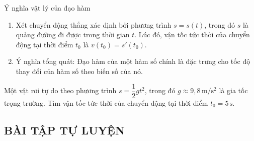 \begin{dang}{Ý nghĩa vật lý của đạo hàm}
	\begin{enumerate}[\iconCH]
		\item Xét chuyển động thẳng xác định bởi phương trình $s=s(t)$, trong đó $s$ là quảng đường đi được trong thời gian $t$. Lúc đó, vận tốc tức thời của chuyển động tại thời điểm $t_0$ là $v(t_0)=s'(t_0)$.
		\item Ý nghĩa tổng quát: Đạo hàm của một hàm số chính là đặc trưng cho tốc độ thay đổi của hàm số theo biến số của nó.
	\end{enumerate}
\end{dang}
\begin{vd}
	Một vật rơi tự do theo phương trình $s=\dfrac{1}{2}gt^2$, trong đó $g\approx 9,8\mathrm{\, m/s^2}$ là gia tốc trọng trường. Tìm vận tốc tức thời của chuyển động tại thời điểm $t_0=5\mathrm{\,s}$.
\end{vd}


\subsection{BÀI TẬP TỰ LUYỆN}

